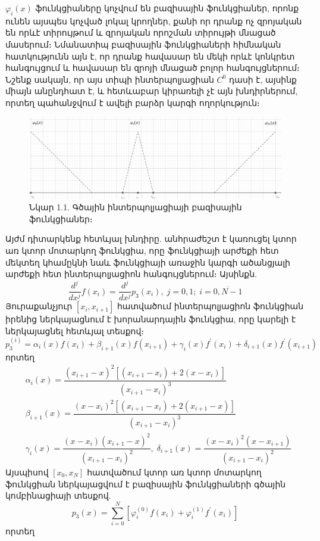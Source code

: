 \documentclass[fleqn, bachelor,subf,12pt,notitlepage]{article}
\begin{document}
$\varphi_{i}\left(x\right)$ ֆունկցիաները կոչվում են բազիսային ֆունկցիաներ, որոնք ունեն այսպես կոչված լոկալ կրողներ, քանի որ դրանք ոչ զրոյական են որևէ տիրույթում և զրոյական որոշման տիրույթի մնացած մասերում։
Նմանատիպ բազիսային ֆունկցիաների հիմնական հատկությունն այն է, որ դրանք հավասար են մեկի որևէ կոնկրետ հանգույցում և հավասար են զրոյի մնացած բոլոր հանգույցներում։ Նշենք սակայն, որ այս տիպի ինտերպոլյացիան $C^{0}$ դասի է, այսինք միայն անընդհատ է, և հետևաբար կիրառելի չէ այն խնդիրներում, որտեղ պահանջվում է ավելի բարձր կարգի ողորկություն։
\begin{figure}[H]
\centering
\includegraphics[width=1.0\textwidth]{images/one_var_linear}
\captionsetup{labelformat=empty}
\caption{Նկար 1.1. Գծային ինտերպոլյացիայի բազիսային ֆունկցիաներ։}
\end{figure}
Այժմ դիտարկենք հետևյալ խնդիրը. անհրաժեշտ է կառուցել  կտոր առ կտոր մոտարկող ֆունկցիա, որը ֆունկցիայի արժեքի հետ մեկտեղ կհամըկնի նաև ֆունկցիայի առաջին կարգի ածանցյալի արժեքի հետ ինտերպոլյացիոն հանգույցներում։ Այսինքն.
\begin{equation}
\dfrac{d^{j}}{dx^j}f(x_{i})=\dfrac{d^{j}}{dx^j}p_{3}(x_{i}),   \; j=0, 1;  \; i=\overline{0, N-1}
\end{equation}
Յուրաքանչյուր $\left[x_{i}, x_{i+1}\right]$ հատվածում ինտերպոլյացիոն ֆունկցիան իրենից ներկայացնում է խորանարդային ֆունկցիա, որը կարելի է ներկայացնել հետևյալ տեսքով։
\begin{equation}
p_{3}^{\left(i\right)} = \alpha_{i}(x)f(x_{i})+\beta_{i+1}(x)f(x_{i+1})+\gamma_{i}(x)f^{'}(x_{i})+\delta_{i+1}(x)f^{'}(x_{i+1})
\end{equation}
որտեղ 
\begin{equation}
\begin{aligned}
&\alpha_{i}(x)=\dfrac{\left(x_{i+1}-x\right)^{2}\left[\left(x_{i+1}-x_{i}\right)+2\left(x-x_{i}\right)\right]}{\left(x_{i+1}-x_{i}\right)^{3}}\\
&\beta_{i+1}(x)=\dfrac{\left(x-x_{i}\right)^{2}\left[\left(x_{i+1}-x_{i}\right)+2\left(x_{i+1}-x\right)\right]}{\left(x_{i+1}-x_{i}\right)^{3}}\\
&\gamma_{i}(x)=\dfrac{\left(x-x_{i}\right)\left(x_{i+1}-x\right)^{2}}{\left(x_{i+1}-x_{i}\right)^{2}}, \; \delta_{i+1}(x)=\dfrac{\left(x-x_{i}\right)^2\left(x-x_{i+1}\right)}{\left(x_{i+1}-x_{i}\right)^{2}}
\end{aligned}
\end{equation}
Այսպիսով $\left[x_{0}, x_{N}\right]$ հատվածում կտոր առ կտոր մոտարկող ֆունկցիան ներկայացվում է բազիսային ֆունկցիաների գծային կոմբինացիայի տեսքով.
\begin{equation}
p_{3}(x)=\sum_{i=0}^{N}\left[\varphi_{i}^{(0)}f(x_{i})+\varphi_{i}^{(1)}f^{'}(x_{i})\right]
\end{equation}
որտեղ 
\end{document}

